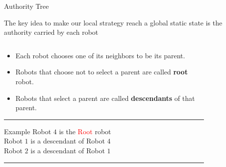 \documentclass[10pt]{beamer}
\begin{document}
\begin{frame}{Authority Tree}{}
  \begin{block}{The key idea to make our local strategy reach a global static
    state is the authority carried by each robot}
    \begin{columns}[T] %
      \begin{column}{.65\textwidth}
        \begin{itemize}
        \item Each robot chooses one of its neighbors to be its
          parent.
        \item Robots that choose not to select a parent are
          called \textbf{root} robot.
        \item Robots that select a parent are called
          \textbf{descendants} of that parent. 
        \end{itemize} 
        \hrule
        \begin{bclogo}[noborder=true, logo=\bccrayon]{Example} 
          Robot $4$ is the \textcolor{red}{Root} robot\\
          Robot $1$ is a descendant of Robot $4$\\
          Robot $2$ is a descendant of Robot $1$
        \end{bclogo}
        \hrule
      \end{column}%
      \begin{column}{.35\textwidth}
        \begin{figure}[center]
          \centering
        \end{figure} 
      \end{column}%
    \end{columns}
   \end{block} 
\end{frame}
\end{document}
